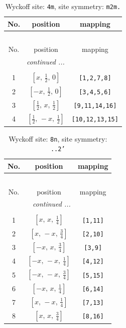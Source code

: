 \documentclass[fleqn,8pt]{jsarticle}
\begin{document}
\renewcommand{\arraystretch}{1.2}
\begin{longtable}{ccc}
\caption{Wyckoff site: {\tt 4m}, site symmetry: {\tt m2m.}}
 \\
 \hline \hline
No. & position & mapping \\ \hline \endfirsthead

\multicolumn{2}{l}{\tablename\ \thetable{}} \\
 \hline \hline
No. & position & mapping \\ \hline \endhead

 \hline \hline
\multicolumn{2}{r}{\footnotesize\it continued ...} \\ \endfoot

 \hline \hline
\multicolumn{2}{r}{} \\ \endlastfoot

1 & $\left[ x,\, \frac{1}{2},\, 0 \right]$ & {\tt [1,2,7,8]} \\ \hline
2 & $\left[ - x,\, \frac{1}{2},\, 0 \right]$ & {\tt [3,4,5,6]} \\ \hline
3 & $\left[ \frac{1}{2},\, x,\, \frac{1}{2} \right]$ & {\tt [9,11,14,16]} \\ \hline
4 & $\left[ \frac{1}{2},\, - x,\, \frac{1}{2} \right]$ & {\tt [10,12,13,15]} \\
\end{longtable}
\renewcommand{\arraystretch}{1.2}
\begin{longtable}{ccc}
\caption{Wyckoff site: {\tt 8n}, site symmetry: {\tt ..2'}}
 \\
 \hline \hline
No. & position & mapping \\ \hline \endfirsthead

\multicolumn{2}{l}{\tablename\ \thetable{}} \\
 \hline \hline
No. & position & mapping \\ \hline \endhead

 \hline \hline
\multicolumn{2}{r}{\footnotesize\it continued ...} \\ \endfoot

 \hline \hline
\multicolumn{2}{r}{} \\ \endlastfoot

1 & $\left[ x,\, x,\, \frac{1}{4} \right]$ & {\tt [1,11]} \\ \hline
2 & $\left[ x,\, - x,\, \frac{3}{4} \right]$ & {\tt [2,10]} \\ \hline
3 & $\left[ - x,\, x,\, \frac{3}{4} \right]$ & {\tt [3,9]} \\ \hline
4 & $\left[ - x,\, - x,\, \frac{1}{4} \right]$ & {\tt [4,12]} \\ \hline
5 & $\left[ - x,\, - x,\, \frac{3}{4} \right]$ & {\tt [5,15]} \\ \hline
6 & $\left[ - x,\, x,\, \frac{1}{4} \right]$ & {\tt [6,14]} \\ \hline
7 & $\left[ x,\, - x,\, \frac{1}{4} \right]$ & {\tt [7,13]} \\ \hline
8 & $\left[ x,\, x,\, \frac{3}{4} \right]$ & {\tt [8,16]} \\
\end{longtable}
\end{document}
